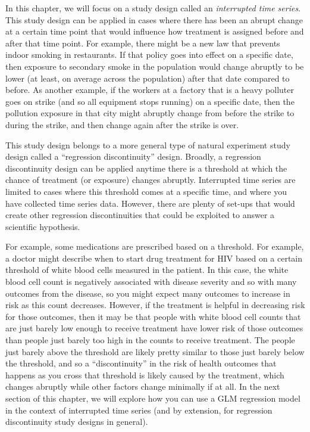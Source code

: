 \documentclass[
]{book}
\begin{document}
In this chapter, we will focus on a study design called an \emph{interrupted time series}. This study design can be applied in cases where there has been an abrupt change at a certain time point that would influence how treatment is assigned before and after that time point. For example, there might be a new law that prevents indoor smoking in restaurants. If that policy goes into effect on a specific date, then exposure to secondary smoke in the population would change abruptly to be lower (at least, on average across the population) after that date compared to before. As another example, if the workers at a factory that is a heavy polluter goes on strike (and so all equipment stops running) on a specific date, then the pollution exposure in that city might abruptly change from before the strike to during the strike, and then change again after the strike is over.

This study design belongs to a more general type of natural experiment study design called a ``regression discontinuity'' design. Broadly, a regression discontinuity design can be applied anytime there is a threshold at which the chance of treatment (or exposure) changes abruptly. Interrupted time series are limited to cases where this threshold comes at a specific time, and where you have collected time series data. However, there are plenty of set-ups that would create other regression discontinuities that could be exploited to answer a scientific hypothesis.

For example, some medications are prescribed based on a threshold. For example, a doctor might describe when to start drug treatment for HIV based on a certain threshold of white blood cells measured in the patient. In this case, the white blood cell count is negatively associated with disease severity and so with many outcomes from the disease, so you might expect many outcomes to increase in risk as this count decreases. However, if the treatment is helpful in decreasing risk for those outcomes, then it may be that people with white blood cell counts that are just barely low enough to receive treatment have lower risk of those outcomes than people just barely too high in the counts to receive treatment. The people just barely above the threshold are likely pretty similar to those just barely below the threshold, and so a ``discontinuity'' in the risk of health outcomes that happens as you cross that threshold is likely caused by the treatment, which changes abruptly while other factors change minimally if at all. In the next section of this chapter, we will explore how you can use a GLM regression model in the context of interrupted time series (and by extension, for regression discontinuity study designs in general).
\end{document}
